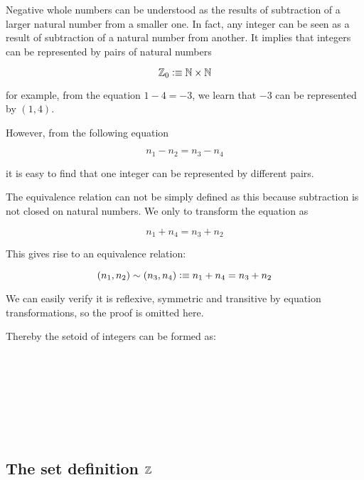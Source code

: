 Negative whole numbers can be understood as the results
of subtraction of a larger natural number from a smaller one. In fact, any integer can be seen as a result of subtraction of a natural number from another. It implies that integers can be represented by pairs of natural numbers


$$\mathbb{Z}_0 \vcentcolon\equiv \mathbb{N} \times \mathbb{N}$$

for example, from the equation $1 - 4 = - 3$, we learn that $- 3$ can be represented by $(1,4)$.

However, from the following equation

$$n_1 - n_2 = n_3 - n_4$$

it is easy to find that one integer can be represented by different pairs.

The equivalence relation can not be simply defined as this because subtraction is not closed on natural numbers. We only to transform the equation as

$$ n_1 + n_4 = n_3 + n_2$$

This gives rise to an equivalence relation:


$$(n_1,n_2) \sim (n_3,n_4) \vcentcolon\equiv  n_1 + n_4 = n_3 + n_2$$

We can easily verify it is reflexive, symmetric and
transitive by equation transformations, so the proof is omitted here.

Thereby the setoid of integers can be formed as:

\begin{code}
\\
\> \AgdaSymbol{:} \<%
\\
\> \AgdaSymbol{=} \<%
\\
\>[2]\<[3]%
\>[3]\AgdaSymbol{\{}  \<[19]%
\>[19]\AgdaSymbol{=} \<%
\\
\>[2]\<[3]%
\>[3]\AgdaSymbol{;}  \<[19]%
\>[19]\AgdaSymbol{=} \<%
\\
\>[2]\<[3]%
\>[3]\AgdaSymbol{;}  \AgdaSymbol{=} \<%
\\
\>[2]\<[3]%
\>[3]\AgdaSymbol{\}}\<%
\end{code}

\subsection{The set definition $\mathbb{Z}$}


